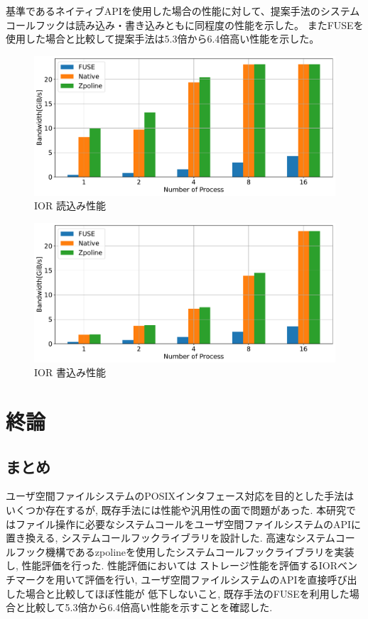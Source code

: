\documentclass[a4paper,11pt]{jreport}
\begin{document}
基準であるネイティブAPIを使用した場合の性能に対して、提案手法のシステムコールフックは読み込み・書き込みともに同程度の性能を示した。
またFUSEを使用した場合と比較して提案手法は5.3倍から6.4倍高い性能を示した。

\newpage

\begin{figure}[h]
	\begin{minipage}[b]{1\columnwidth}
		\centering
		\includegraphics[width=0.9\linewidth]{./figure/ior_benchmark_read.pdf}
		\caption{IOR 読込み性能}
		\label{fig:Evaluation read}
	\end{minipage}
\end{figure}

\begin{figure}[h]
    \begin{minipage}[b]{1\columnwidth}
		\centering
		\includegraphics[width=0.9\linewidth]{./figure/ior_benchmark_write.pdf}
		\caption{IOR 書込み性能}
		\label{fig:Evaluation write}
	\end{minipage}
\end{figure}

\chapter{終論}
\section{まとめ}
ユーザ空間ファイルシステムのPOSIXインタフェース対応を目的とした手法はいくつか存在するが, 既存手法には性能や汎用性の面で問題があった.
本研究ではファイル操作に必要なシステムコールをユーザ空間ファイルシステムのAPIに置き換える, システムコールフックライブラリを設計した.
高速なシステムコールフック機構であるzpolineを使用したシステムコールフックライブラリを実装し, 性能評価を行った. 性能評価においては
ストレージ性能を評価するIORベンチマークを用いて評価を行い, ユーザ空間ファイルシステムのAPIを直接呼び出した場合と比較してほぼ性能が
低下しないこと, 既存手法のFUSEを利用した場合と比較して5.3倍から6.4倍高い性能を示すことを確認した.
\end{document}
